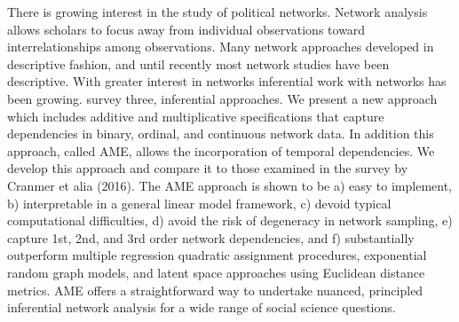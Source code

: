 There is growing interest in the study of political networks. Network analysis allows scholars to focus away from  individual observations toward interrelationships among observations.   Many network approaches developed in descriptive fashion, and until recently most network studies have been descriptive. With greater interest in networks inferential work with networks has been growing.   \citet{cranmer:etal:2016} survey three, inferential approaches.  We present a new approach which includes additive and multiplicative specifications that capture dependencies in binary, ordinal, and continuous network data. In addition this approach, called AME,  allows the incorporation of temporal dependencies.  We develop this approach and compare it to those examined in the survey by Cranmer et alia (2016).  The AME approach is shown to be a) easy to implement, b) interpretable in a general linear model framework, c) devoid typical computational difficulties, d) avoid the risk of degeneracy in network sampling, e) capture 1st, 2nd, and 3rd order network dependencies, and f) substantially outperform multiple regression quadratic assignment procedures, exponential random graph models, and latent space approaches using  Euclidean distance metrics. AME offers a straightforward way to undertake nuanced, principled inferential network analysis for a wide range of social science questions. 

 